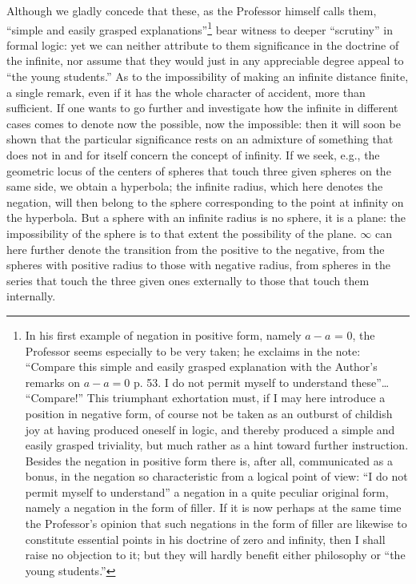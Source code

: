 \documentclass[12pt,a4paper,openany]{book}
\newcommand{\opage}[1]{\marginnote{\footnotesize\textit{[#1]}}}
\begin{document}
Although we gladly concede that these, as the Professor
himself calls them, ``simple and easily grasped explanations''\footnote{In his first example of negation in positive form, namely $a-a$
= 0, the Professor seems especially to be very taken; he exclaims
in the note: ``Compare this simple and easily grasped explanation with the Author's remarks on $a-a = 0$ p. 53. I do not permit myself to understand these''\dots{} ``Compare!'' This
triumphant exhortation must, if I may here introduce a
position in negative form, of course not be taken as an outburst of %
childish joy at having produced oneself in logic, and thereby produced a simple and easily grasped triviality, but much
rather as a hint toward further instruction. Besides the negation
in positive form there is, after all, communicated as a bonus, in the negation so characteristic from a logical point of view: ``I do not permit myself to understand''
a negation in a quite peculiar original form, namely a negation
in the form of filler. If it is now perhaps at the same time the Professor's opinion that such negations in the form of filler are likewise to constitute essential points in his doctrine of zero and infinity, then
I shall raise no objection to it; but they will hardly benefit
either philosophy or ``the young students.''}
bear witness to deeper ``scrutiny'' in formal logic: yet we can neither attribute to them significance in the doctrine of the
infinite, nor assume that they would just in any appreciable degree
appeal to ``the young students.'' As to the impossibility of
making an infinite distance finite, a single remark,
even if it has the whole character of accident, more than
\opage{41}\setcounter{footnote}{0}%
sufficient. If one wants to go further and investigate how
the infinite in different cases comes to denote
now the possible, now the impossible: then it will soon be shown
that the particular significance rests on an admixture of
something that does not in and for itself concern the concept of infinity. If we seek, e.g., the geometric locus of the centers
of spheres that touch three given spheres on the same side, we obtain
a hyperbola; the infinite radius, which here denotes the negation, will then belong to the sphere corresponding to the point at infinity on the
hyperbola. But a sphere with an infinite radius is no sphere, it is a plane: the impossibility of the sphere is to that extent the possibility of the plane. $\infty$ can
here further denote the transition from the positive to the negative,
from the spheres with positive radius to those with negative radius, from spheres in the series that touch the three given ones externally to those that touch them internally.
\end{document}
